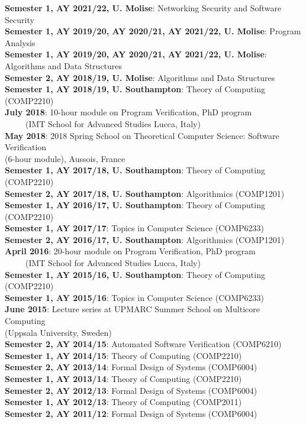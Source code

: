 \begin{resume}
{\bf Semester 1, AY 2021/22, U. Molise}: Networking Security and Software Security\\
{\bf Semester 1, AY 2019/20, AY 2020/21, AY 2021/22, U. Molise}: Program Analysis\\
{\bf Semester 1, AY 2019/20, AY 2020/21, AY 2021/22, U. Molise}: Algorithms and Data Structures\\
{\bf Semester 2, AY 2018/19, U. Molise}: Algorithms and Data Structures\\
{\bf Semester 1, AY 2018/19, U. Southampton}: Theory of Computing (COMP2210)\\
{\bf July 2018}:  10-hour module on Program Verification, PhD program\\
~~~~~(IMT School for Advanced Studies Lucca, Italy)\\
{\bf May 2018}:  2018 Spring School on Theoretical Computer Science: Software Verification\\ 
(6-hour module), Aussois, France\\
{\bf Semester 1, AY 2017/18, U. Southampton}: Theory of Computing (COMP2210)\\
{\bf Semester 2, AY 2017/18, U. Southampton}: Algorithmics (COMP1201)\\
{\bf Semester 1, AY 2016/17, U. Southampton}: Theory of Computing (COMP2210)\\
{\bf Semester 1, AY 2017/17}: Topics in Computer Science (COMP6233)\\
{\bf Semester 2, AY 2016/17, U. Southampton}: Algorithmics (COMP1201)\\
{\bf April 2016}: 20-hour module on Program Verification, PhD program\\
~~~~~(IMT School for Advanced Studies Lucca, Italy)\\
{\bf Semester 1, AY 2015/16, U. Southampton}: Theory of Computing (COMP2210)\\
{\bf Semester 1, AY 2015/16}: Topics in Computer Science (COMP6233)\\
{\bf June 2015}: Lecture series at UPMARC Summer School on Multicore Computing\\ 
(Uppsala University, Sweden)\\
{\bf Semester 2, AY 2014/15}: Automated Software Verification (COMP6210)\\
{\bf Semester 1, AY 2014/15}: Theory of Computing (COMP2210)\\
{\bf Semester 2, AY 2013/14}: Formal Design of Systems (COMP6004)\\
{\bf Semester 1, AY 2013/14}: Theory of Computing (COMP2210)\\
{\bf Semester 2, AY 2012/13}: Formal Design of Systems (COMP6004)\\
{\bf Semester 1, AY 2012/13}: Theory of Computing (COMP2011)\\
{\bf Semester 2, AY 2011/12}: Formal Design of Systems (COMP6004)\\




\end{resume}
